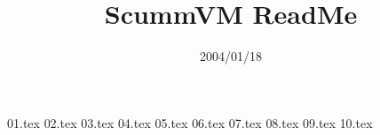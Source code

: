 \documentclass [a4paper]{article}
\title {ScummVM ReadMe}
\date {2004/01/18}
\begin{document}
%
\pagestyle {empty}
\fancyhf {}
\fancyhead [LE, RO] {\thepage}
\renewcommand {\headrulewidth} {1pt}
%
\maketitle
\tableofcontents
%
\newpage
\pagestyle {fancy}
 {01.tex}
 {02.tex}
 {03.tex}
 {04.tex}
 {05.tex}
 {06.tex}
 {07.tex}
 {08.tex}
 {09.tex}
 {10.tex}
\end{document}
